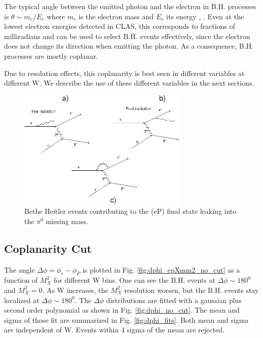 \clearpage\newpage

The typical angle between the emitted photon and the electron in B.H. processes is $\theta \sim m_e/E_e$
where $m_e$ is the electron mass and $E_e$ its energy \cite{bib:motsai}, \cite{bib:andrei_private}.
Even at the lowest electron energies detected in CLAS, this
corresponds to fractions of milliradians and can be used to select B.H. events effectively, since the electron
does not change its direction when emitting the photon. As a consequence, B.H. processes are mostly coplanar.

Due to resolution effects, this coplanarity is best seen in different variables at different W. We describe the
use of these different variables in the next sections.



\vspace{0.7 cm}
\begin{figure}[ht]
	\centering
		\includegraphics[width=0.72\textwidth ]{img/bethe.jpg}
		\caption{Bethe Heitler events contributing to the (eP) final state leaking into
		the $\pi^0$ missing mass. }
			\label{fig:bethe}
\end{figure}



\subsection{Coplanarity Cut}
The angle $\Delta\phi = \phi_e-\phi_P$ is plotted in Fig. \ref{fig:dphi_epXmm2_no_cut} as a function
of $M_X^2$ for different W bins. One can see the B.H. events at $\Delta\phi \sim 180^0$ and $M_X^2 = 0$.
As W increases, the $M_X^2$ resolution worsen, but the B.H. events stay localized at $\Delta\phi \sim 180^0$.
The $\Delta\phi$ distributions are fitted with a gaussian plus second order polynomial as shown in Fig. \ref{fig:dphi_no_cut}.
The mean and sigma of those fit are summarized in Fig. \ref{fig:dphi_fits}. Both mean and sigma
are independent of W. Events within 4 sigma of the mean are rejected.

